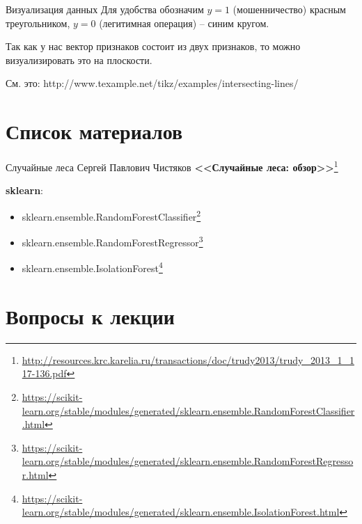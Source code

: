 \documentclass{beamer}
\begin{document}
  \begin{frame}{Визуализация данных}
  Для удобства обозначим $y=1$ (мошенничество) красным треугольником, 
  $y=0$ (легитимная операция) -- синим кругом.
  
  Так как у нас вектор признаков состоит из двух признаков, то можно визуализировать это на плоскости.
  
  См. это: http://www.texample.net/tikz/examples/intersecting-lines/
  
  
  \end{frame}
  
  \section{Список материалов}
  
  \begin{frame}{Случайные леса}
  Сергей Павлович Чистяков \textbf{<<Случайные леса: обзор>>}\footnote{\tiny
\url{http://resources.krc.karelia.ru/transactions/doc/trudy2013/trudy_2013_1_117-136.pdf}
}

	\textbf{sklearn}:
	\begin{itemize}
		\item sklearn.ensemble.RandomForestClassifier\footnote{
			\tiny \url{https://scikit-learn.org/stable/modules/generated/sklearn.ensemble.RandomForestClassifier.html}
		}
		\item sklearn.ensemble.RandomForestRegressor\footnote{
			\tiny
			\url{https://scikit-learn.org/stable/modules/generated/sklearn.ensemble.RandomForestRegressor.html}
		}
	    \item sklearn.ensemble.IsolationForest\footnote{
	       \tiny
	       \url{https://scikit-learn.org/stable/modules/generated/sklearn.ensemble.IsolationForest.html}
    	}
	\end{itemize}
  \end{frame}
  
  \section{Вопросы к лекции}
  
\end{document}
